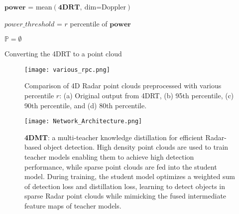 \begin{algorithm}
    \DontPrintSemicolon
    \SetNoFillComment

    \BlankLine

    $\mathbf{power}$ = \textrm{mean}$\left(\mathbf{4DRT}, ~\textrm{dim=Doppler}\right)$  
    
    \BlankLine

    $power\_threshold$ = $r$ percentile of $\mathbf{power}$ 
    
    \BlankLine
    
    $\mathbb{P} = \emptyset$

    \caption{Converting the 4DRT to a point cloud}
    \label{alg:preproc}
\end{algorithm}

\begin{figure}[ht!]
    \centerline{\texttt{[image: various\_rpc.png]}}
    \caption{
        Comparison of 4D Radar point clouds preprocessed with various percentile $r$: (a) Original output from 4DRT, (b) 95th percentile, (c) 90th percentile, and (d) 80th percentile.
    }
    \label{fig.percentile_density}
\end{figure}

\begin{figure*}[tb]
    \centerline{\texttt{[image: Network\_Architecture.png]}}
    \caption{
        \textbf{4DMT}: a multi-teacher knowledge distillation for efficient Radar-based object detection.
        High density point clouds are used to train teacher models enabling them to achieve high detection performance, while
        sparse point clouds are fed into the student model.
        During training, the student model optimizes a weighted sum of detection loss and distillation loss, learning to detect objects in sparse Radar point clouds while mimicking the fused intermediate feature maps of teacher models.
    }
    \label{fig.architecture}
\end{figure*}

